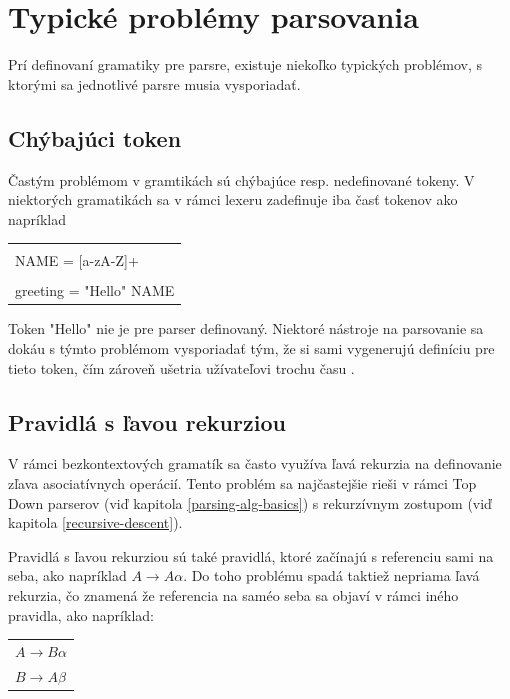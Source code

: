 \section{Typické problémy parsovania}
Prí definovaní gramatiky pre parsre, existuje niekoľko typických problémov, s ktorými sa jednotlivé parsre musia vysporiadať. 

\subsection{Chýbajúci token}
Častým problémom v gramtikách sú chýbajúce resp. nedefinované tokeny. V niektorých gramatikách sa v rámci lexeru zadefinuje iba časť tokenov ako napríklad

\begin{center}
\begin{tabular}{p{}}
\color{editorGray}{/* Lexer */}\\
NAME = [a-zA-Z]+\\
\color{editorGray}{/* Parser */}\\
greeting = "Hello"{ NAME}
\end{tabular}
\end{center}

Token "Hello"{ }nie je pre parser definovaný. Niektoré nástroje na parsovanie sa dokáu s týmto problémom vysporiadať tým, že si sami vygenerujú definíciu pre tieto token, čím zároveň ušetria užívateľovi trochu času \cite{tomassetti:parsing}.

\subsection{Pravidlá s ľavou rekurziou}\label{left-recursion-rule}
V rámci bezkontextových gramatík sa často využíva ľavá rekurzia na definovanie zľava asociatívnych operácií. Tento problém sa najčastejšie rieši v rámci Top Down parserov (viď kapitola \ref{parsing-alg-basics}) s rekurzívnym zostupom (viď kapitola \ref{recursive-descent}). 

Pravidlá s ľavou rekurziou sú také pravidlá, ktoré začínajú s referenciu sami na seba, ako napríklad $A \rightarrow A\alpha$. Do toho problému spadá taktiež nepriama ľavá rekurzia, čo znamená že referencia na saméo seba sa objaví v rámci iného pravidla, ako napríklad:

\begin{center}
\begin{tabular}{p{}}
$A \rightarrow B\alpha$\\
$B \rightarrow A\beta$\\
\end{tabular}
\end{center}

